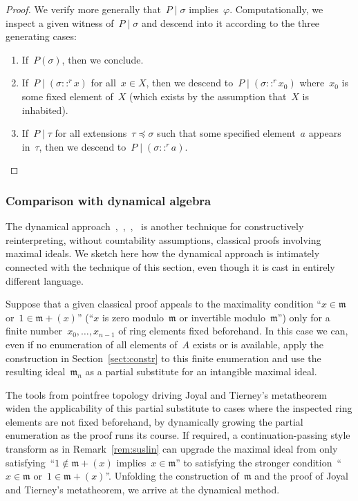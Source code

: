 \documentclass[envcountsect,envcountsame,runningheads]{llncs}
\newcommand{\mmm}{\mathfrak{m}}
\renewcommand{\_}{\mathpunct{.}\,}
\begin{document}
\begin{proof}We verify more generally that~$P \mid \sigma$ implies~$\varphi$.
Computationally, we inspect a given witness of~$P \mid \sigma$ and descend into
it according to the three generating cases:
\begin{enumerate}
\item If~$P(\sigma)$, then we conclude.
\item
If~$P \mid (\sigma ::^r x)$ for all~$x \in X$, then we descend to~$P \mid
(\sigma ::^r x_0)$ where~$x_0$ is some fixed element of~$X$ (which exists by
the assumption that~$X$ is inhabited).
\item If~$P \mid \tau$ for all
extensions~$\tau \preceq \sigma$ such that some specified element~$a$ appears
in~$\tau$, then we descend to~$P \mid (\sigma ::^r a)$.
\end{enumerate}
\end{proof}


\subsubsection{Comparison with dynamical algebra}

The dynamical approach~\cite[Section~XV.6]{lombardi-quitte:constructive-algebra},~\cite{coquand-lombardi-roy:dynamicalmethod},~\cite{yengui:constructive},~\cite{duval:about}
is another technique for constructively reinterpreting,
without countability assumptions, classical proofs involving maximal ideals.
We sketch here how the dynamical approach is intimately connected with the
technique of this section, even though it is cast in entirely different
language.

Suppose that a given classical proof appeals to the maximality condition ``$x \in \mmm$
or~$1 \in \mmm + (x)$'' (``$x$ is zero modulo~$\mmm$ or invertible
modulo~$\mmm$'') only for a finite number~$x_0,\ldots,x_{n-1}$ of ring elements
fixed beforehand. In this case we can, even if no enumeration of all elements
of~$A$ exists or is available, apply the construction in Section~\ref{sect:constr} to
this finite enumeration and use the resulting ideal~$\mmm_n$ as a partial
substitute for an intangible maximal ideal.

The tools from pointfree topology
driving Joyal and Tierney's metatheorem widen the applicability of this partial
substitute to cases where the inspected ring elements are
not fixed beforehand, by dynamically growing the partial enumeration as the
proof runs its course. If required, a continuation-passing style transform as
in Remark~\ref{rem:suslin} can upgrade the maximal ideal from only
satisfying~``$1 \not\in \mmm + (x)$ implies~$x \in
\mmm$'' to satisfying the stronger condition~``$x \in \mmm$ or~$1 \in \mmm
+ (x)$''.
%
Unfolding the construction of~$\mmm$ and the proof of Joyal
and Tierney's metatheorem, we arrive at the dynamical method.
\end{document}
